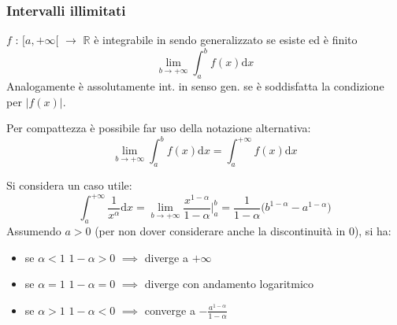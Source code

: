 \documentclass[10pt]{article}
\theoremstyle{plain}
\begin{document}
\subsubsection{Intervalli illimitati}
\begin{defin}
    $f$ : $[a,+\infty[$ $\rightarrow$ $\mathbb{R}$ è integrabile in sendo generalizzato se esiste ed è finito
    \[\lim\limits_{b \rightarrow +\infty} \int_{a}^{b} f(x)\textrm{d}x\]
    Analogamente è assolutamente int. in senso gen. se è soddisfatta la condizione per $|f(x)|$.
\end{defin}
\begin{oss}
    Per compattezza è possibile far uso della notazione alternativa:
    \[\lim\limits_{b \rightarrow +\infty} \int_{a}^{b} f(x)\textrm{d}x = \int_{a}^{+\infty} f(x)\textrm{d}x\]
\end{oss}
Si considera un caso utile:
\[\int_{a}^{+\infty} \frac{1}{x^\alpha}\textrm{d}x = \lim\limits_{b \rightarrow +\infty} \frac{x^{1-\alpha}}{1 - \alpha}\bigg|_a^b = \frac{1}{1-\alpha}\big(b^{1-\alpha} - a^{1-\alpha}\big)\]
Assumendo $a > 0$ (per non dover considerare anche la discontinuità in $0$), si ha:
\begin{itemize}
    \item se $\alpha < 1$ $1 - \alpha > 0$ $\implies$ diverge a $+\infty$
    \item se $\alpha = 1$ $1 - \alpha = 0$ $\implies$ diverge con andamento logaritmico
    \item se $\alpha > 1$ $1 - \alpha < 0$ $\implies$ converge a $-\frac{a^{1-\alpha}}{1-\alpha}$
\end{itemize}
\end{document}

